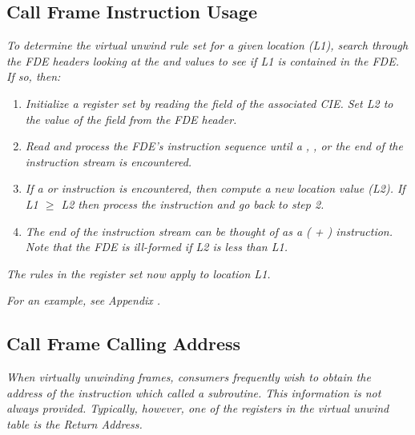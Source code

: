 \subsection{Call Frame Instruction Usage} 
\label{chap:callframeinstructionusage}

\textit{To determine the virtual unwind rule set for a given location
(L1), search through the FDE headers looking at the
\HFNinitiallocation{} and \HFNaddressrange{} values to see if L1 is
contained in the FDE. If so, then:}
\begin{enumerate}[1. ]

\item \textit{Initialize a register set by reading the
\HFNinitialinstructions{} field of the associated CIE.
Set L2 to the value of the \HFNinitiallocation{} field from the FDE header.}


\item \textit{Read and process the FDE's instruction
sequence until a \DWCFAadvanceloc, 
\DWCFAsetloc, or the
end of the instruction stream is encountered.}

\item \textit{ If a \DWCFAadvanceloc{} or \DWCFAsetloc{}
instruction is encountered, then compute a new location value
(L2). If L1 $\geq$ L2 then process the instruction and go back
to step 2.}

\item \textit{ The end of the instruction stream can be thought
of as a \DWCFAsetloc{} ( + )
instruction. Note that the FDE is ill-formed if L2 is less
than L1.}

\end{enumerate}

\textit{The rules in the register set now apply to location L1.}

\textit{For an example, see 
Appendix .}



\subsection{Call Frame Calling Address}
\label{chap:callframecallingaddress}

\textit{When 
virtually unwinding frames, consumers frequently wish to obtain 
the address of the instruction which called a subroutine. This
information is not always provided. Typically, however,
one of the registers in the virtual unwind table is the
Return Address.}

